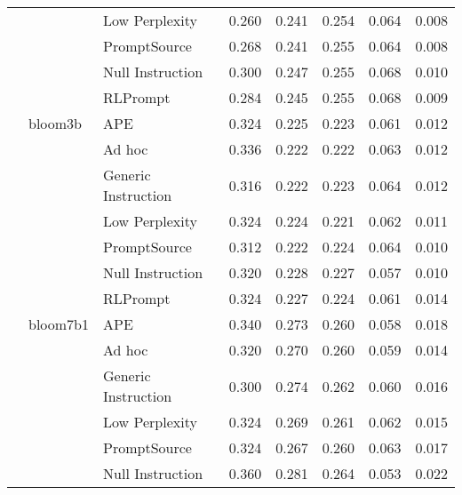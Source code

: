 \begin{supertabular}{lllrrrrr}
              &        & Low Perplexity &            0.260 &           0.241 &          0.254 &        0.064 &    0.008 \\
              &        & PromptSource &            0.268 &           0.241 &          0.255 &        0.064 &    0.008 \\
              &        & Null Instruction &            0.300 &           0.247 &          0.255 &        0.068 &    0.010 \\
              &        & RLPrompt &            0.284 &           0.245 &          0.255 &        0.068 &    0.009 \\
              & bloom3b & APE &            0.324 &           0.225 &          0.223 &        0.061 &    0.012 \\
              &        & Ad hoc &            0.336 &           0.222 &          0.222 &        0.063 &    0.012 \\
              &        & Generic Instruction &            0.316 &           0.222 &          0.223 &        0.064 &    0.012 \\
              &        & Low Perplexity &            0.324 &           0.224 &          0.221 &        0.062 &    0.011 \\
              &        & PromptSource &            0.312 &           0.222 &          0.224 &        0.064 &    0.010 \\
              &        & Null Instruction &            0.320 &           0.228 &          0.227 &        0.057 &    0.010 \\
              &        & RLPrompt &            0.324 &           0.227 &          0.224 &        0.061 &    0.014 \\
              & bloom7b1 & APE &            0.340 &           0.273 &          0.260 &        0.058 &    0.018 \\
              &        & Ad hoc &            0.320 &           0.270 &          0.260 &        0.059 &    0.014 \\
              &        & Generic Instruction &            0.300 &           0.274 &          0.262 &        0.060 &    0.016 \\
              &        & Low Perplexity &            0.324 &           0.269 &          0.261 &        0.062 &    0.015 \\
              &        & PromptSource &            0.324 &           0.267 &          0.260 &        0.063 &    0.017 \\
              &        & Null Instruction &            0.360 &           0.281 &          0.264 &        0.053 &    0.022 \\

\end{supertabular}
